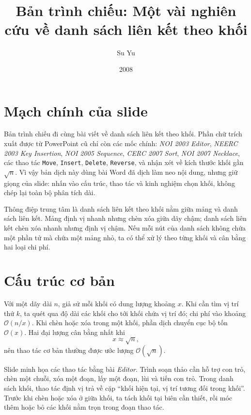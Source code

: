 \documentclass[11pt]{article}
\title{Bản trình chiếu: Một vài nghiên cứu về danh sách liên kết theo khối}
\author{Su Yu}
\date{2008}
\newcommand{\Oh}{\mathcal{O}}
\begin{document}
\maketitle


\section{Mạch chính của slide}

Bản trình chiếu đi cùng bài viết về danh sách liên kết theo khối. Phần chữ
trích xuất được từ PowerPoint cũ chỉ còn các mốc chính: \textit{NOI 2003
Editor}, \textit{NEERC 2003 Key Insertion}, \textit{NOI 2005 Sequence},
\textit{CERC 2007 Sort}, \textit{NOI 2007 Necklace}, các thao tác
\texttt{Move}, \texttt{Insert}, \texttt{Delete}, \texttt{Reverse}, và nhận
xét về kích thước khối gần \(\sqrt n\). Vì vậy bản dịch này dùng bài Word đã
dịch làm neo nội dung, nhưng giữ giọng của slide: nhấn vào cấu trúc, thao tác
và kinh nghiệm chọn khối, không chép lại toàn bộ phân tích dài.

Thông điệp trung tâm là danh sách liên kết theo khối nằm giữa mảng và danh
sách liên kết. Mảng định vị nhanh nhưng chèn xóa giữa dãy chậm; danh sách
liên kết chèn xóa nhanh nhưng định vị chậm. Nếu mỗi nút của danh sách không
chứa một phần tử mà chứa một mảng nhỏ, ta có thể xử lý theo từng khối và cân
bằng hai loại chi phí.

\section{Cấu trúc cơ bản}

Với một dãy dài \(n\), giả sử mỗi khối có dung lượng khoảng \(x\). Khi cần tìm
vị trí thứ \(k\), ta quét qua độ dài các khối cho tới khối chứa vị trí đó; chi
phí vào khoảng \(\Oh(n/x)\). Khi chèn hoặc xóa trong một khối, phần dịch
chuyển cục bộ tốn \(\Oh(x)\). Hai đại lượng cân bằng nhất khi
\[
  x \approx \sqrt n,
\]
nên thao tác cơ bản thường được ước lượng \(\Oh(\sqrt n)\).

Slide minh họa các thao tác bằng bài \textit{Editor}. Trình soạn thảo cần hỗ
trợ con trỏ, chèn một chuỗi, xóa một đoạn, lấy một đoạn, lùi và tiến con trỏ.
Trong danh sách khối, thao tác định vị trả về cặp ``khối hiện tại, vị trí
tương đối trong khối''. Trước khi chèn hoặc xóa ở giữa khối, ta tách khối tại
biên cần thiết, rồi móc thêm hoặc bỏ các khối nằm trọn trong đoạn thao tác.
\end{document}
